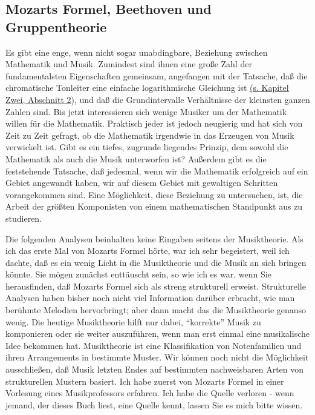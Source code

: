 
\subsection{Mozarts Formel, Beethoven und Gruppentheorie}
\label{c1iv4}

Es gibt eine enge, wenn nicht sogar unabdingbare, Beziehung zwischen Mathematik und Musik.
Zumindest sind ihnen eine große Zahl der fundamentalsten Eigenschaften gemeinsam, angefangen mit der Tatsache, daß die chromatische Tonleiter eine einfache logarithmische Gleichung ist \hyperref[c2_2]{(s. Kapitel Zwei, Abschnitt 2)}, und daß die Grundintervalle Verhältnisse der kleinsten ganzen Zahlen sind.
Bis jetzt interessieren sich wenige Musiker um der Mathematik willen für die Mathematik.
Praktisch jeder ist jedoch neugierig und hat sich von Zeit zu Zeit gefragt, ob die Mathematik irgendwie in das Erzeugen von Musik verwickelt ist.
Gibt es ein tiefes, zugrunde liegendes Prinzip, dem sowohl die Mathematik als auch die Musik unterworfen ist?
Außerdem gibt es die feststehende Tatsache, daß jedesmal, wenn wir die Mathematik erfolgreich auf ein Gebiet angewandt haben, wir auf diesem Gebiet mit gewaltigen Schritten vorangekommen sind.
Eine Möglichkeit, diese Beziehung zu untersuchen, ist, die Arbeit der größten Komponisten von einem mathematischen Standpunkt aus zu studieren.

Die folgenden Analysen beinhalten keine Eingaben seitens der Musiktheorie.
Als ich das erste Mal von Mozarts Formel hörte, war ich sehr begeistert, weil ich dachte, daß es ein wenig Licht in die Musiktheorie und die Musik an sich bringen könnte.
Sie mögen zunächst enttäuscht sein, so wie ich es war, wenn Sie herausfinden, daß Mozarts Formel sich als streng strukturell erweist.
Strukturelle Analysen haben bisher noch nicht viel Information darüber erbracht, wie man berühmte Melodien hervorbringt; aber dann macht das die Musiktheorie genauso wenig.
Die heutige Musiktheorie hilft nur dabei, \enquote{korrekte} Musik zu komponieren oder sie weiter auszuführen, wenn man erst einmal eine musikalische Idee bekommen hat.
Musiktheorie ist eine Klassifikation von Notenfamilien und ihren Arrangements in bestimmte Muster.
Wir können noch nicht die Möglichkeit ausschließen, daß Musik letzten Endes auf bestimmten nachweisbaren Arten von strukturellen Mustern basiert.
Ich habe zuerst von Mozarts Formel in einer Vorlesung eines Musikprofessors erfahren.
Ich habe die Quelle verloren - wenn jemand, der dieses Buch liest, eine Quelle kennt, lassen Sie es mich bitte wissen.

